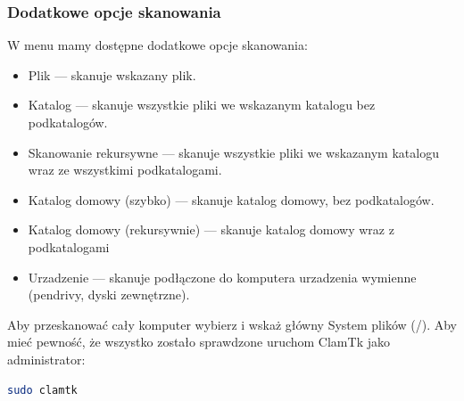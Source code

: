 \subsubsection{Dodatkowe opcje skanowania}
W menu  mamy dostępne dodatkowe opcje skanowania:
\begin{itemize}
\item \textcolor{ubuntu_orange}{Plik} --- skanuje wskazany plik.
\item \textcolor{ubuntu_orange}{Katalog} --- skanuje wszystkie pliki we wskazanym katalogu bez podkatalogów.
\item \textcolor{ubuntu_orange}{Skanowanie rekursywne} --- skanuje wszystkie pliki we wskazanym katalogu wraz ze wszystkimi podkatalogami.
\item \textcolor{ubuntu_orange}{Katalog domowy (szybko)} --- skanuje katalog domowy, bez podkatalogów.
\item \textcolor{ubuntu_orange}{Katalog domowy (rekursywnie)} --- skanuje katalog domowy wraz z podkatalogami
\item \textcolor{ubuntu_orange}{Urzadzenie} --- skanuje podłączone do komputera urzadzenia wymienne (pendrivy, dyski zewnętrzne).
\end{itemize}

Aby przeskanować cały komputer wybierz  i wskaż główny \textcolor{ubuntu_orange}{System plików} (/). Aby mieć pewność, że wszystko zostało sprawdzone uruchom ClamTk jako administrator:
\begin{lstlisting}[language=bash]
sudo clamtk
\end{lstlisting}